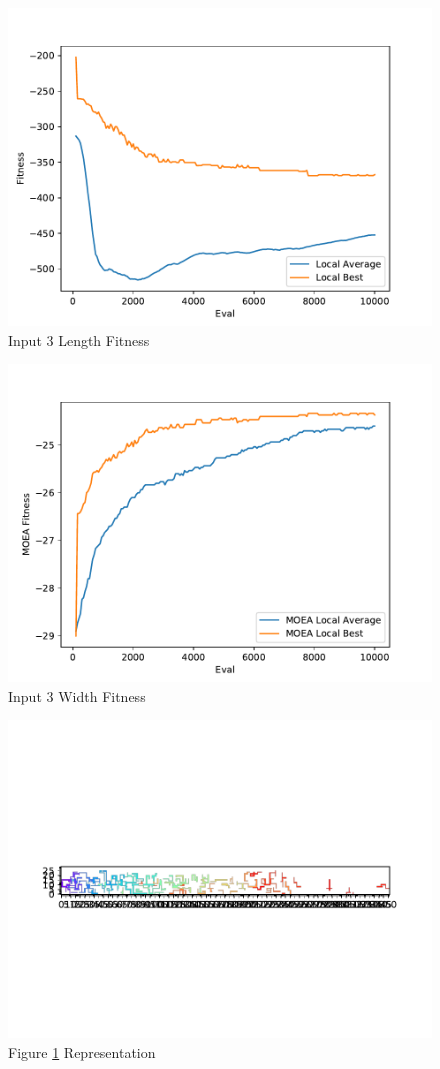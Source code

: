 \documentclass{standalone}
\begin{document}
\begin{figure}[!htb]
	\caption{Input 3 Length Fitness}
	\label{fig:graph_3006}
	\includegraphics[width=\textwidth]{../graphs/graphs/3006.pdf}
\end{figure}


\begin{figure}[!htb]
	\caption{Input 3 Width Fitness}
	\label{fig:graph_3006_moea}
	\includegraphics[width=\textwidth]{../graphs/graphs/3006_moea.pdf}
\end{figure}


\begin{figure}[!htb]
	\caption{Figure \ref{fig:graph_3006} Representation}
	\label{fig:picture_3006}
	\includegraphics[width=\textwidth]{../graphs/picture/3006.pdf}
\end{figure}
\end{document}
